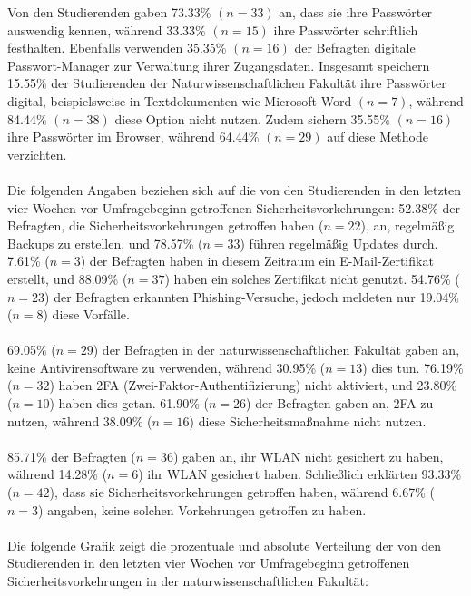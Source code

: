 \documentclass[german,report]{i1thesis}
\begin{document}
Von den Studierenden gaben 73.33\% \((n=33)\) an, dass sie ihre Passwörter auswendig kennen, während 33.33\% \((n=15)\) ihre Passwörter schriftlich festhalten. Ebenfalls verwenden 35.35\% \((n=16)\) der Befragten digitale Passwort-Manager zur Verwaltung ihrer Zugangsdaten. Insgesamt speichern 15.55\% der Studierenden der Naturwissenschaftlichen Fakultät ihre Passwörter digital, beispielsweise in Textdokumenten wie Microsoft Word \((n=7)\), während 84.44\% \((n=38)\) diese Option nicht nutzen. Zudem sichern 35.55\% \((n=16)\) ihre Passwörter im Browser, während 64.44\% \((n=29)\) auf diese Methode verzichten.\\
\\
Die folgenden Angaben beziehen sich auf die von den Studierenden in den letzten vier Wochen vor Umfragebeginn getroffenen Sicherheitsvorkehrungen: 52.38\% der Befragten, die Sicherheitsvorkehrungen getroffen haben (\(n = 22\)), an, regelmäßig Backups zu erstellen, und 78.57\% (\(n = 33\)) führen regelmäßig Updates durch. 7.61\% (\(n = 3\)) der Befragten haben in diesem Zeitraum ein E-Mail-Zertifikat erstellt, und 88.09\% (\(n = 37\)) haben ein solches Zertifikat nicht genutzt. 54.76\% (\(n = 23\)) der Befragten erkannten Phishing-Versuche, jedoch meldeten nur 19.04\% (\(n = 8\)) diese Vorfälle.\\
\\
69.05\% (\(n = 29\)) der Befragten in der naturwissenschaftlichen Fakultät gaben an, keine Antivirensoftware zu verwenden, während 30.95\% (\(n = 13\)) dies tun. 76.19\% (\(n = 32\)) haben 2FA (Zwei-Faktor-Authentifizierung) nicht aktiviert, und 23.80\% (\(n = 10\)) haben dies getan. 61.90\% (\(n = 26\)) der Befragten gaben an, 2FA zu nutzen, während 38.09\% (\(n = 16\)) diese Sicherheitsmaßnahme nicht nutzen.\\
\\
85.71\% der Befragten (\(n = 36\)) gaben an, ihr WLAN nicht gesichert zu haben, während 14.28\% (\(n = 6\)) ihr WLAN gesichert haben. Schließlich erklärten 93.33\% (\(n = 42\)), dass sie Sicherheitsvorkehrungen getroffen haben, während 6.67\% (\(n = 3\)) angaben, keine solchen Vorkehrungen getroffen zu haben.\\
\\
Die folgende Grafik zeigt die prozentuale und absolute Verteilung der von den Studierenden in den letzten vier Wochen vor Umfragebeginn getroffenen Sicherheitsvorkehrungen in der naturwissenschaftlichen Fakultät:
\end{document}
